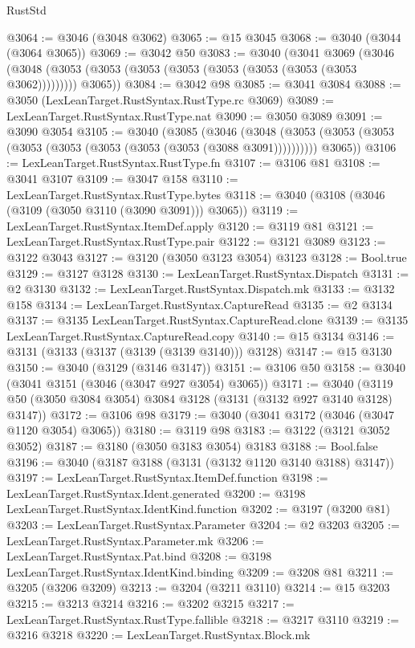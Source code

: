 \begin{lexlean}{RustStd}
\begin{coremodule}
@3064 := @3046 (@3048 @3062)
@3065 := @15 @3045
@3068 := @3040 (@3044 (@3064 @3065))
@3069 := @3042 @50
@3083 := @3040
    (@3041
      @3069
      (@3046 (@3048 (@3053 (@3053 (@3053 (@3053 (@3053 (@3053 (@3053 (@3053 @3062))))))))) @3065))
@3084 := @3042 @98
@3085 := @3041 @3084
@3088 := @3050 (LexLeanTarget.RustSyntax.RustType.rc @3069)
@3089 := LexLeanTarget.RustSyntax.RustType.nat
@3090 := @3050 @3089
@3091 := @3090 @3054
@3105 := @3040
    (@3085
      (@3046
        (@3048 (@3053 (@3053 (@3053 (@3053 (@3053 (@3053 (@3053 (@3053 (@3088 @3091))))))))))
        @3065))
@3106 := LexLeanTarget.RustSyntax.RustType.fn
@3107 := @3106 @81
@3108 := @3041 @3107
@3109 := @3047 @158
@3110 := LexLeanTarget.RustSyntax.RustType.bytes
@3118 := @3040 (@3108 (@3046 (@3109 (@3050 @3110 (@3090 @3091))) @3065))
@3119 := LexLeanTarget.RustSyntax.ItemDef.apply
@3120 := @3119 @81
@3121 := LexLeanTarget.RustSyntax.RustType.pair
@3122 := @3121 @3089
@3123 := @3122 @3043
@3127 := @3120 (@3050 @3123 @3054) @3123
@3128 := Bool.true
@3129 := @3127 @3128
@3130 := LexLeanTarget.RustSyntax.Dispatch
@3131 := @2 @3130
@3132 := LexLeanTarget.RustSyntax.Dispatch.mk
@3133 := @3132 @158
@3134 := LexLeanTarget.RustSyntax.CaptureRead
@3135 := @2 @3134
@3137 := @3135 LexLeanTarget.RustSyntax.CaptureRead.clone
@3139 := @3135 LexLeanTarget.RustSyntax.CaptureRead.copy
@3140 := @15 @3134
@3146 := @3131 (@3133 (@3137 (@3139 (@3139 @3140))) @3128)
@3147 := @15 @3130
@3150 := @3040 (@3129 (@3146 @3147))
@3151 := @3106 @50
@3158 := @3040 (@3041 @3151 (@3046 (@3047 @927 @3054) @3065))
@3171 := @3040 (@3119 @50 (@3050 @3084 @3054) @3084 @3128 (@3131 (@3132 @927 @3140 @3128) @3147))
@3172 := @3106 @98
@3179 := @3040 (@3041 @3172 (@3046 (@3047 @1120 @3054) @3065))
@3180 := @3119 @98
@3183 := @3122 (@3121 @3052 @3052)
@3187 := @3180 (@3050 @3183 @3054) @3183
@3188 := Bool.false
@3196 := @3040 (@3187 @3188 (@3131 (@3132 @1120 @3140 @3188) @3147))
@3197 := LexLeanTarget.RustSyntax.ItemDef.function
@3198 := LexLeanTarget.RustSyntax.Ident.generated
@3200 := @3198 LexLeanTarget.RustSyntax.IdentKind.function
@3202 := @3197 (@3200 @81)
@3203 := LexLeanTarget.RustSyntax.Parameter
@3204 := @2 @3203
@3205 := LexLeanTarget.RustSyntax.Parameter.mk
@3206 := LexLeanTarget.RustSyntax.Pat.bind
@3208 := @3198 LexLeanTarget.RustSyntax.IdentKind.binding
@3209 := @3208 @81
@3211 := @3205 (@3206 @3209)
@3213 := @3204 (@3211 @3110)
@3214 := @15 @3203
@3215 := @3213 @3214
@3216 := @3202 @3215
@3217 := LexLeanTarget.RustSyntax.RustType.fallible
@3218 := @3217 @3110
@3219 := @3216 @3218
@3220 := LexLeanTarget.RustSyntax.Block.mk

\end{coremodule}
\end{lexlean}
